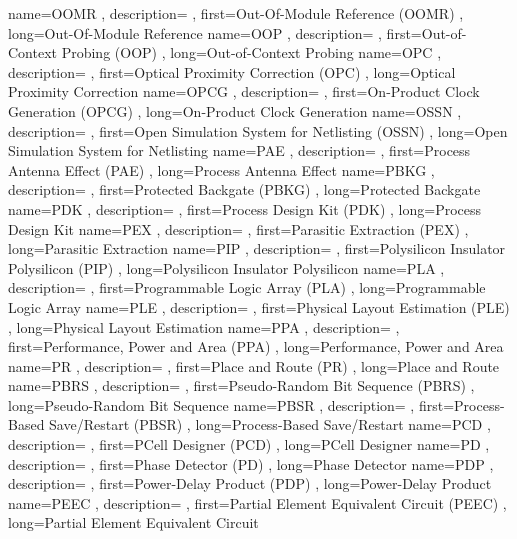 { name={OOMR}
, description={}
, first={Out-Of-Module Reference (OOMR)}
, long={Out-Of-Module Reference}
}
{ name={OOP}
, description={}
, first={Out-of-Context Probing (OOP)}
, long={Out-of-Context Probing}
}
{ name={OPC}
, description={}
, first={Optical Proximity Correction (OPC)}
, long={Optical Proximity Correction}
}
{ name={OPCG}
, description={}
, first={On-Product Clock Generation (OPCG)}
, long={On-Product Clock Generation}
}
{ name={OSSN}
, description={}
, first={Open Simulation System for Netlisting (OSSN)}
, long={Open Simulation System for Netlisting}
}
{ name={PAE}
, description={}
, first={Process Antenna Effect (PAE)}
, long={Process Antenna Effect}
}
{ name={PBKG}
, description={}
, first={Protected Backgate (PBKG)}
, long={Protected Backgate}
}
{ name={PDK}
, description={}
, first={Process Design Kit (PDK)}
, long={Process Design Kit}
}
{ name={PEX}
, description={}
, first={Parasitic Extraction (PEX)}
, long={Parasitic Extraction}
}
{ name={PIP}
, description={}
, first={Polysilicon Insulator Polysilicon (PIP)}
, long={Polysilicon Insulator Polysilicon}
}
{ name={PLA}
, description={}
, first={Programmable Logic Array (PLA)}
, long={Programmable Logic Array}
}
{ name={PLE}
, description={}
, first={Physical Layout Estimation (PLE)}
, long={Physical Layout Estimation}
}
{ name={PPA}
, description={}
, first={Performance, Power and Area (PPA)}
, long={Performance, Power and Area}
}
{ name={PR}
, description={}
, first={Place and Route (PR)}
, long={Place and Route}
}
{ name={PBRS}
, description={}
, first={Pseudo-Random Bit Sequence (PBRS)}
, long={Pseudo-Random Bit Sequence}
}
{ name={PBSR}
, description={}
, first={Process-Based Save/Restart (PBSR)}
, long={Process-Based Save/Restart}
}
{ name={PCD}
, description={}
, first={PCell Designer (PCD)}
, long={PCell Designer}
}
{ name={PD}
, description={}
, first={Phase Detector (PD)}
, long={Phase Detector}
}
{ name={PDP}
, description={}
, first={Power-Delay Product (PDP)}
, long={Power-Delay Product}
}
{ name={PEEC}
, description={}
, first={Partial Element Equivalent Circuit (PEEC)}
, long={Partial Element Equivalent Circuit}
}

